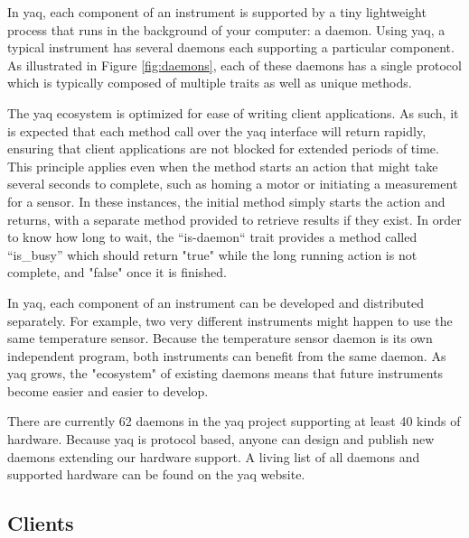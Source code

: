 \documentclass[aip, amsmath, amssymb, reprint,]{revtex4-1}
\begin{document}
In yaq, each component of an instrument is supported by a tiny lightweight process that runs in the background of your computer: a daemon.
Using yaq, a typical instrument has several daemons each supporting a particular component.
As illustrated in Figure \ref{fig:daemons}, each of these daemons has a single protocol which is typically composed of multiple traits as well as unique methods.

The yaq ecosystem is optimized for ease of writing client applications.
As such, it is expected that each method call over the yaq interface will return rapidly, ensuring that client applications are not blocked for extended periods of time.
This principle applies even when the method starts an action that might take several seconds to complete, such as homing a motor or initiating a measurement for a sensor.
In these instances, the initial method simply starts the action and returns, with a separate method provided to retrieve results if they exist.
In order to know how long to wait, the ``is-daemon`` trait provides a method called ``is\_busy'' which should return "true" while the long running action is not complete, and "false" once it is finished.

In yaq, each component of an instrument can be developed and distributed separately.
For example, two very different instruments might happen to use the same temperature sensor.
Because the temperature sensor daemon is its own independent program, both instruments can benefit from the same daemon.
As yaq grows, the "ecosystem" of existing daemons means that future instruments become easier and easier to develop.

There are currently 62 daemons in the yaq project supporting at least 40 kinds of hardware.
Because yaq is protocol based, anyone can design and publish new daemons extending our hardware support.
A living list of all daemons and supported hardware can be found on the yaq website.

\subsection{Clients} \label{sec:clients}
\end{document}
